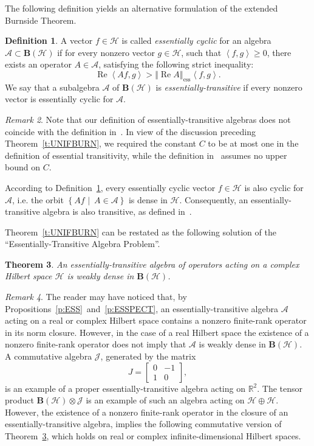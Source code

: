 \documentclass{tran-l}
\newtheorem{thm}{Theorem}[subsection]
\theoremstyle{definition}
\newtheorem{defn}[thm]{Definition}
\theoremstyle{remark}
\newtheorem{rem}[thm]{Remark}
\numberwithin{equation}{subsection}
\DeclareMathOperator{\RE}{Re}
\DeclareMathOperator{\ess}{ess}
\newcommand{\h}{\mathcal{H}}
\newcommand{\A}{\mathcal{A}}
\newcommand{\J}{\mathcal{J}}
\newcommand{\BH}{\mathbf{B}(\mathcal{H})}
\newcommand{\Real}{\mathbb{R}}
\newcommand{\set}[1]{\left\{#1\right\}}
\newcommand{\seq}[1]{\left<#1\right>}
\newcommand{\norm}[1]{\left\Vert#1\right\Vert}
\newcommand{\essnorm}[1]{\norm{#1}_{\ess}}
\begin{document}
The following definition yields an alternative formulation of the extended Burnside Theorem.

\begin{defn}\label{d:ESSTRANS}
A vector $f\in\h$ is called \emph{essentially cyclic} for an algebra $\A\subset\BH$ if for every nonzero vector $g\in\h$, such that $\seq{f,g}\geq0$, there exists an operator $A\in\A$, satisfying the following strict inequality:
\[  \RE{\seq{A{f},g}} > \essnorm{\RE{A}} \seq{f,g}. \]
We say that a subalgebra $\A$ of $\BH$ is \emph{essentially-transitive} if every nonzero vector is essentially cyclic for $\A$.
\end{defn}

\begin{rem}
Note that our definition of essentially-transitive algebras does not coincide with the definition in~\cite{Lom91}. In view of the discussion preceding Theorem~\ref{t:UNIFBURN}, we required the constant $C$ to be at most one in the definition of essential transitivity, while the definition in~\cite{Lom91} assumes no upper bound on $C$.

According to Definition~\ref{d:ESSTRANS}, every essentially cyclic vector $f\in\h$ is also cyclic for $\A$, i.e. the orbit $\set{A{f}\,\,|\,\,\,A\in\A}$ is dense in $\h$. Consequently, an essentially-transitive algebra is also transitive, as defined in~\cite{RR73}.
\end{rem}

Theorem~\ref{t:UNIFBURN} can be restated as the following solution of the ``Essentially-Transitive Algebra Problem''.

\begin{thm}\label{t:ESSBURN}
An essentially-transitive algebra of operators acting on a complex Hilbert space $\h$ is weakly dense in $\BH$.
\end{thm}

\begin{rem}
The reader may have noticed that, by Propositions~\ref{p:ESS}~and~\ref{p:ESSPECT}, an essentially-transitive algebra $\A$ acting on a real or complex Hilbert space contains a nonzero finite-rank operator in its norm closure. However, in the case of a real Hilbert space the existence of a nonzero finite-rank operator does not imply that $\A$ is weakly dense in $\BH$. A commutative algebra $\J$, generated by the matrix
\[ J= \left[
        \begin{array}{rr}
          0 & -1 \\
          1 &  0
        \end{array}
      \right], \]
is an example of a proper essentially-transitive algebra acting on $\Real^2$. The tensor product $\BH\otimes\J$ is an example of such an algebra acting on $\h\oplus\h$. However, the existence of a nonzero finite-rank operator in the closure of an essentially-transitive algebra, implies the following commutative version of Theorem~\ref{t:ESSBURN}, which holds on real or complex infinite-dimensional Hilbert spaces.
\end{rem}
\end{document}
